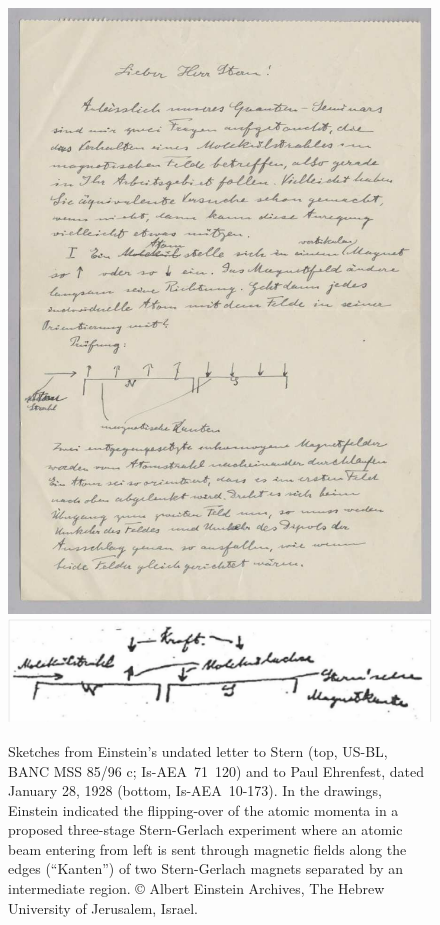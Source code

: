 \documentclass{article}
\begin{document}
\begin{figure}
\begin{center}
\includegraphics[scale=1.20]{figures/Einstein_sketch_color}
\includegraphics[scale=0.4]{figures/Einstein_sketch2}
\caption{Sketches from Einstein's undated letter to Stern (top, US-BL, BANC MSS 85/96 c; Is-AEA~71~120) and to Paul Ehrenfest, dated January 28, 1928 (bottom, Is-AEA~10-173). In the drawings, Einstein indicated the flipping-over of the atomic momenta in a proposed three-stage Stern-Gerlach experiment where an atomic beam entering from left is sent through magnetic fields along the edges (``Kanten'') of two Stern-Gerlach magnets separated by an intermediate region. \copyright{} Albert Einstein Archives, The Hebrew University of Jerusalem, Israel.}
\label{fig:Einstein_sketch}
\end{center}
\end{figure}
%
\end{document}
